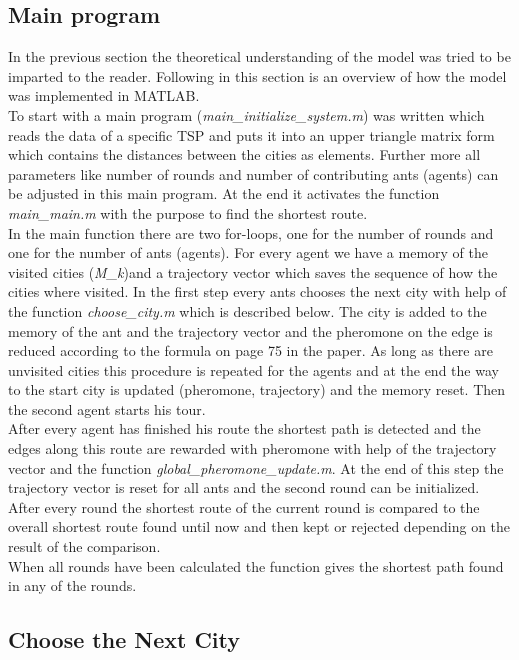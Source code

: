 \subsection{Main program}
In the previous section the theoretical understanding of the model was tried to be imparted to the reader. Following in this section is an overview of how the model was implemented in MATLAB. \\
To start with a main program (\textit{main\_initialize\_system.m}) was written which reads the data of a specific TSP and puts it into an upper triangle matrix form which contains the distances between the cities as elements. Further more all parameters like number of rounds and number of contributing ants (agents) can be adjusted in this main program. At the end it activates the function \textit{main\_main.m} with the purpose to find the shortest route. \\
In the main function there are two for-loops, one for the number of rounds and one for the number of ants (agents). For every agent we have a memory of the visited cities (\textit{M\_k})and a trajectory vector which saves the sequence of how the cities where visited. In the first step every ants chooses the next city with help of the function \textit{choose\_city.m} which is described below. The city is added to the memory of the ant and the trajectory vector and the pheromone on the edge is reduced according to the formula on page 75 in the paper. As long as there are unvisited cities this procedure is repeated for the agents and at the end the way to the start city is updated (pheromone, trajectory) and the memory reset. Then the second agent starts his tour. \\
After every agent has finished his route the shortest path is detected and the edges along this route are rewarded with pheromone with help of the trajectory vector and the function \textit{global\_pheromone\_update.m}. At the end of this step the trajectory vector is reset for all ants and the second round can be initialized. After every round the shortest route of the current round is compared to the overall shortest route found until now and then kept or rejected depending on the result of the comparison. \\
When all rounds have been calculated the function gives the shortest path found in any of the rounds.

\subsection{Choose the Next City}

